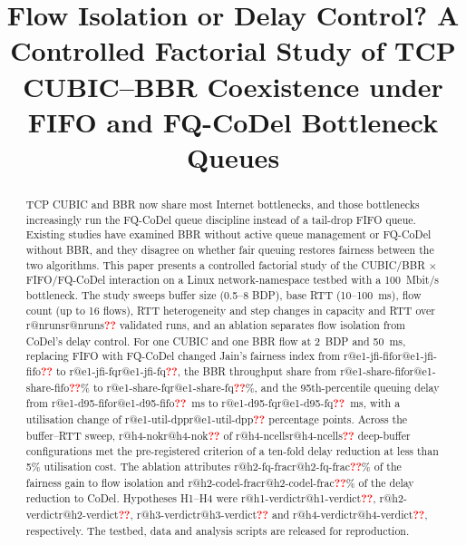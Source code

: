 \documentclass[conference]{IEEEtran}
\makeatletter
\newcommand{\R}[1]{\ifcsname r@#1\endcsname\csname r@#1\endcsname\else\textcolor{red}{\textbf{??}}\fi}
\makeatother
\begin{document}
\title{Flow Isolation or Delay Control? A Controlled Factorial Study of TCP CUBIC--BBR Coexistence under FIFO and FQ-CoDel Bottleneck Queues}

\author{
}

\maketitle

\begin{abstract}
TCP CUBIC and BBR now share most Internet bottlenecks, and those bottlenecks increasingly run the FQ-CoDel queue discipline instead of a tail-drop FIFO queue. Existing studies have examined BBR without active queue management or FQ-CoDel without BBR, and they disagree on whether fair queuing restores fairness between the two algorithms. This paper presents a controlled factorial study of the CUBIC/BBR $\times$ FIFO/FQ-CoDel interaction on a Linux network-namespace testbed with a 100~Mbit/s bottleneck. The study sweeps buffer size (0.5--8 BDP), base RTT (10--100~ms), flow count (up to 16 flows), RTT heterogeneity and step changes in capacity and RTT over \R{nruns} validated runs, and an ablation separates flow isolation from CoDel's delay control. For one CUBIC and one BBR flow at 2~BDP and 50~ms, replacing FIFO with FQ-CoDel changed Jain's fairness index from \R{e1-jfi-fifo} to \R{e1-jfi-fq}, the BBR throughput share from \R{e1-share-fifo}\% to \R{e1-share-fq}\%, and the 95th-percentile queuing delay from \R{e1-d95-fifo}~ms to \R{e1-d95-fq}~ms, with a utilisation change of \R{e1-util-dpp} percentage points. Across the buffer--RTT sweep, \R{h4-nok} of \R{h4-ncells} deep-buffer configurations met the pre-registered criterion of a ten-fold delay reduction at less than 5\% utilisation cost. The ablation attributes \R{h2-fq-frac}\% of the fairness gain to flow isolation and \R{h2-codel-frac}\% of the delay reduction to CoDel. Hypotheses H1--H4 were \R{h1-verdict}, \R{h2-verdict}, \R{h3-verdict} and \R{h4-verdict}, respectively. The testbed, data and analysis scripts are released for reproduction.
\end{abstract}
\end{document}
